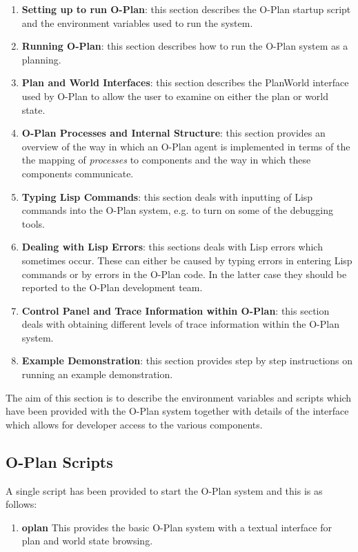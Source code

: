 \begin{enumerate}
\item {\bf Setting up to run O-Plan}: this section describes the O-Plan
startup script and the environment variables used to run the system. 
\item {\bf Running O-Plan}: this section describes how to run the
O-Plan system as a planning.
\item {\bf Plan and World Interfaces}: this section describes the
PlanWorld interface used by O-Plan to allow the user to examine on
either the plan or world state.
\item {\bf O-Plan Processes and Internal Structure}: this section
provides an overview of the way in which an O-Plan agent is
implemented in terms of the the mapping of {\em processes} to
components and the way in which these components communicate.
\item {\bf Typing Lisp Commands}: this section deals with inputting of
Lisp commands into the O-Plan system, e.g. to turn on some of the
debugging tools.
\item {\bf Dealing with Lisp Errors}: this sections deals with Lisp
errors which sometimes occur. These can either be caused by typing
errors in entering Lisp commands or by errors in the O-Plan
code. In the latter case they should be reported to the O-Plan
development team.
\item {\bf Control Panel and Trace Information within O-Plan}: this
section deals with obtaining different levels of trace information
within the O-Plan system. 
\item {\bf Example Demonstration}: this section provides step by step
instructions on running an example demonstration.
\end{enumerate}

The aim of this section is to describe the environment variables and
scripts which have been provided with the O-Plan system
together with details of the interface which allows for developer
access to the various components. 

\subsection{O-Plan Scripts}
A single script has been provided to start the O-Plan system and this
is as follows:

\begin{enumerate}
\item {\bf oplan} \newline
This provides the basic O-Plan system with a textual interface for
plan and world state browsing. 
\end{enumerate}

